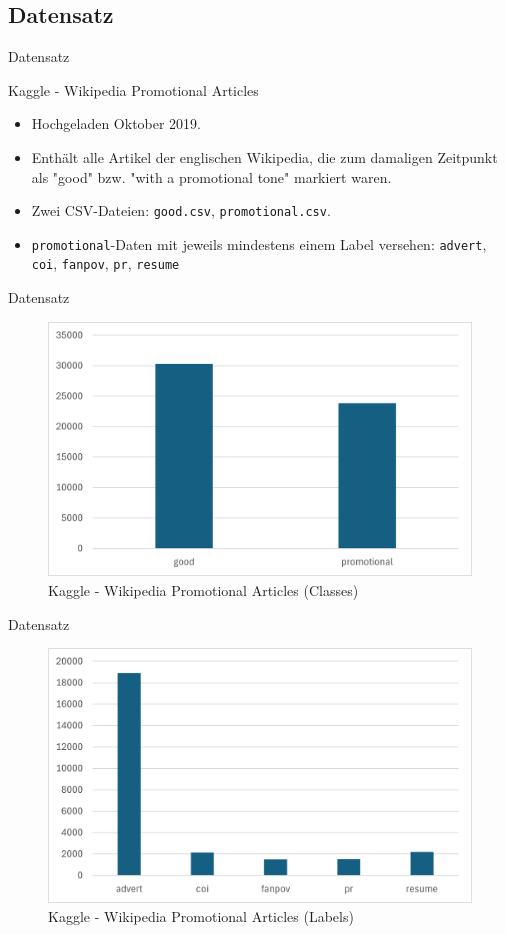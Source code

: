 \documentclass[aspectratio=169]{beamer} %
\begin{document}
\subsection{Datensatz}

\begin{frame}{Datensatz}
    \begin{block}{Kaggle - Wikipedia Promotional Articles}
        \begin{itemize}
            \item Hochgeladen Oktober 2019.
            \item Enthält alle Artikel der englischen Wikipedia, die zum damaligen Zeitpunkt als "good" bzw. "with a promotional tone" markiert waren.
            \item Zwei CSV-Dateien: \texttt{good.csv}, \texttt{promotional.csv}.
            \item \texttt{promotional}-Daten mit jeweils mindestens einem Label versehen: \texttt{advert}, \texttt{coi}, \texttt{fanpov}, \texttt{pr}, \texttt{resume}
        \end{itemize}
    \end{block}
\end{frame}

\begin{frame}{Datensatz}
    \begin{figure}
        \centering
        \includegraphics[width=0.6\linewidth]{figures/kaggle-classes.png}
        \caption{Kaggle - Wikipedia Promotional Articles (Classes)}
    \end{figure}
\end{frame}

\begin{frame}{Datensatz}
    \begin{figure}
        \centering
        \includegraphics[width=0.6\linewidth]{figures/kaggle-promo-labels.png}
        \caption{Kaggle - Wikipedia Promotional Articles (Labels)}
    \end{figure}
\end{frame}
\end{document}
